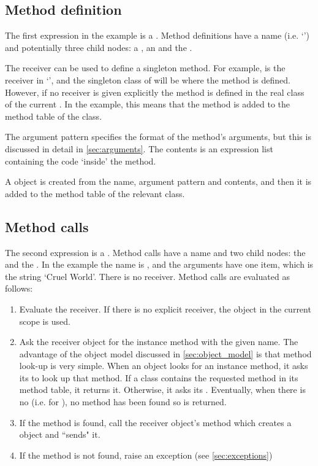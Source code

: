 \subsection{Method definition}

The first expression in the example is a . Method definitions have a name (i.e. `') and potentially three child nodes: a , an  and the .

The receiver can be used to define a singleton method. For example,  is the receiver in `', and the singleton class of  will be where the  method is defined. However, if no receiver is given explicitly the method is defined in the real class of the current . In the example, this means that the  method is added to the method table of the  class.

The argument pattern specifies the format of the method's arguments, but this is discussed in detail in \autoref{sec:arguments}. The contents is an expression list containing the code `inside' the method.

A  object is created from the name, argument pattern and contents, and then it is added to the method table of the relevant class.

\subsection{Method calls}

The second expression is a . Method calls have a name and two child nodes: the  and the . In the example the name is , and the arguments have one item, which is the string `Cruel World'. There is no receiver. Method calls are evaluated as follows:

\begin{enumerate}
  \item Evaluate the receiver. If there is no explicit receiver, the  object in the current scope is used.
  \item Ask the receiver object for the instance method with the given name. The advantage of the object model discussed in \autoref{sec:object_model} is that method look-up is very simple. When an object looks for an instance method, it asks its  to look up that method. If a class contains the requested method in its method table, it returns it. Otherwise, it asks its . Eventually, when there is no  (i.e. for ), no method has been found so  is returned.
  \item If the method is found, call the receiver object's  method which creates a  object and \linebreak ``sends" it.
  \item If the method is not found, raise an exception (see \autoref{sec:exceptions})
\end{enumerate}

